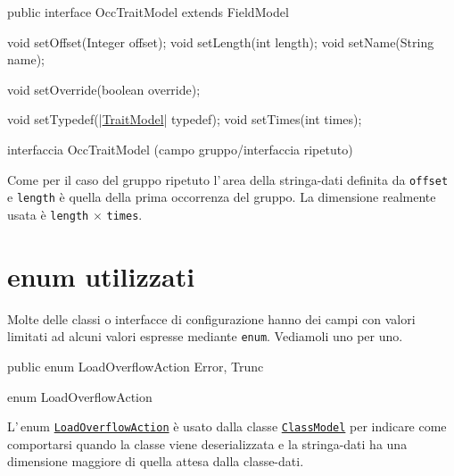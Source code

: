 \documentclass[a4paper,10pt]{report}
\newif\ifesource
\newenvironment{elisting}[1][H]
  {\captionsetup{aboveskip=0pt}\begin{listing}[#1]}
  {\end{listing}%
}
\begin{document}
\ifesource
\begin{figure*}[!htb]
\begin{lstlisting}[language=java, 
caption=interfaccia OccTraitModel (campo gruppo/interfaccia ripetuto), 
label=lst:OccTraitModel]
public interface OccTraitModel extends FieldModel {
    void setOffset(Integer offset);
    void setLength(int length);
    void setName(String name);
    
    void setOverride(boolean override);
    
    void setTypedef((*\hyperref[lst:TraitModel]{TraitModel}*) typedef);
    void setTimes(int times);
}
\end{lstlisting}\index{OccTraitModel}
\end{figure*}
\else
\begin{elisting}[!htb]
\begin{javacode}
public interface OccTraitModel extends FieldModel {
    void setOffset(Integer offset);
    void setLength(int length);
    void setName(String name);
    
    void setOverride(boolean override);
    
    void setTypedef(|\hyperref[lst:TraitModel]{TraitModel}| typedef);
    void setTimes(int times);
}
\end{javacode}
\caption{interfaccia OccTraitModel (campo gruppo/interfaccia ripetuto)}
\label{lst:OccTraitModel}
\end{elisting}
\fi
Come per il caso del gruppo ripetuto l'\,area della stringa-dati definita 
da \verb!offset! e \verb!length! è quella della prima occorrenza del gruppo. 
La dimensione realmente usata è \verb!length! $\times$ \verb!times!.

\chapter{enum utilizzati}
Molte delle classi o interfacce di configurazione hanno dei campi con valori
limitati ad alcuni valori espresse mediante \texttt{enum}.
Vediamoli uno per uno.

\ifesource
\begin{lstlisting}[language=java, 
caption=enum LoadOverflowAction, 
label=lst:LoadOverflowAction]
public enum LoadOverflowAction { Error, Trunc }
\end{lstlisting}\index{LoadOverflowAction}
\else
\begin{elisting}
\begin{javacode}
public enum LoadOverflowAction { Error, Trunc }
\end{javacode}
\caption{enum LoadOverflowAction}\label{lst:LoadOverflowAction}
\end{elisting}
\fi
L'\,enum \hyperref[lst:LoadOverflowAction]{\texttt{LoadOverflowAction}} è usato 
dalla classe \hyperref[lst:ClassModel]{\texttt{ClassModel}} per indicare come 
comportarsi quando la classe viene deserializzata e la stringa-dati ha una 
dimensione maggiore di quella attesa dalla classe-dati.
\end{document}
